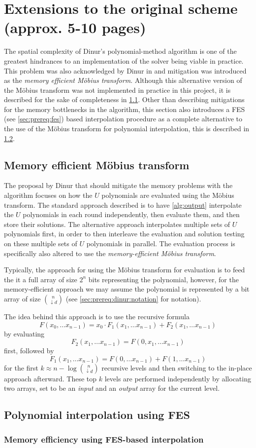 \section{Extensions to the original scheme (approx. 5-10 pages)} \label{sec:ext}
The spatial complexity of Dinur's polynomial-method algorithm is one of the greatest hindrances to an implementation of the solver being viable in practice. This problem was also acknowledged by Dinur in \cite{eurocrypt-2021-30841} and mitigation was introduced as the \textit{memory efficient Möbius transform}. Although this alternative version of the Möbius transform was not implemented in practice in this project, it is described for the sake of completeness in \cref{sec:ext:mem_mob}. Other than describing mitigations for the memory bottlenecks in the algorithm, this section also introduces a FES (see \cref{sec:prereq:fes}) based interpolation procedure as a complete alternative to the use of the Möbius transform for polynomial interpolation, this is described in \cref{sec:ext:fes_interp}.
 
\subsection{Memory efficient Möbius transform} \label{sec:ext:mem_mob}
The proposal by Dinur that should mitigate the memory problems with the algorithm focuses on how the $U$ polynomials are evaluated using the Möbius transform. The standard approach described is to have \cref{alg:output} interpolate the $U$ polynomials in each round independently, then evaluate them, and then store their solutions. The alternative approach interpolates multiple sets of $U$ polynomials first, in order to then interleave the evaluation and solution testing on these multiple sets of $U$ polynomials in parallel. The evaluation process is specifically also altered to use the \textit{memory-efficient Möbius transform}.

Typically, the approach for using the Möbius transform for evaluation is to feed the it a full array of size $2^n$ bits representing the polynomial, however, for the memory-efficient approach we may assume the polynomial is represented by a bit array of size $\binom{n}{\downarrow d}$ (see \cref{sec:prereq:dinur:notation} for notation). 

The idea behind this approach is to use the recursive formula 
$$
    F(x_0, \dots x_{n - 1}) = x_0 \cdot F_1(x_1,\dots x_{n - 1}) + F_2(x_1,\dots x_{n - 1})
$$
by evaluating
$$
    F_2(x_1, \dots x_{n - 1}) = F(0, x_1, \dots x_{n - 1})
$$ 
first, followed by 
$$
    F_1(x_1, \dots x_{n - 1}) = F(0,\dots x_{n-1}) + F(1, \dots x_{n - 1})$$
for the first $k \approx n - \log \binom{n}{\downarrow d}$ recursive levels and then switching to the in-place approach afterward. These top $k$ levels are performed independently by allocating two arrays, set to be an \textit{input} and an \textit{output} array for the current level.
 
\subsection{Polynomial interpolation using FES} \label{sec:ext:fes_interp}

\subsubsection{Memory efficiency using FES-based interpolation} \label{sec:ext:mem_dinur}

\newpage
